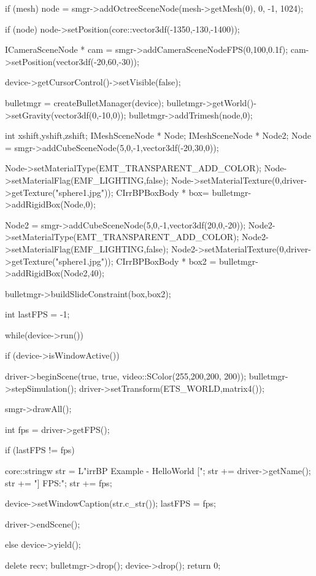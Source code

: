 \begin{DoxyCode}
{        if (mesh)
                node = smgr->addOctreeSceneNode(mesh->getMesh(0), 0, -1, 1024);

        if (node)
                node->setPosition(core::vector3df(-1350,-130,-1400));

        
        ICameraSceneNode * cam =  smgr->addCameraSceneNodeFPS(0,100,0.1f);
        cam->setPosition(vector3df(-20,60,-30));

        
        device->getCursorControl()->setVisible(false);

        bulletmgr = createBulletManager(device);
        bulletmgr->getWorld()->setGravity(vector3df(0,-10,0));
        bulletmgr->addTrimesh(node,0);

        int xshift,yshift,zshift;
        IMeshSceneNode * Node;
        IMeshSceneNode * Node2;
        Node = smgr->addCubeSceneNode(5,0,-1,vector3df(-20,30,0));

        Node->setMaterialType(EMT_TRANSPARENT_ADD_COLOR);
        Node->setMaterialFlag(EMF_LIGHTING,false);
        Node->setMaterialTexture(0,driver->getTexture("sphere1.jpg"));
        CIrrBPBoxBody * box= bulletmgr->addRigidBox(Node,0);
        
        Node2 = smgr->addCubeSceneNode(5,0,-1,vector3df(20,0,-20));
        Node2->setMaterialType(EMT_TRANSPARENT_ADD_COLOR);
        Node2->setMaterialFlag(EMF_LIGHTING,false);
        Node2->setMaterialTexture(0,driver->getTexture("sphere1.jpg"));
        CIrrBPBoxBody * box2 = bulletmgr->addRigidBox(Node2,40);
        
        bulletmgr->buildSlideConstraint(box,box2);

        int lastFPS = -1;

        while(device->run())
        {
                if (device->isWindowActive())
                {
                        driver->beginScene(true, true, video::SColor(255,200,200,
      200));
                        bulletmgr->stepSimulation();
                        driver->setTransform(ETS_WORLD,matrix4());

                        smgr->drawAll();
                
                        int fps = driver->getFPS();

                        if (lastFPS != fps)
                        {
                                
                                core::stringw str = L"irrBP Example - HelloWorld 
      [";
                                str += driver->getName();
                                str += "] FPS:";
                                str += fps;

                                device->setWindowCaption(str.c_str());
                                lastFPS = fps;
                        }
                        driver->endScene();
                }
                else
                        device->yield();
        }

        delete recv;
        bulletmgr->drop();
        device->drop();
        return 0;
}
\end{DoxyCode}
